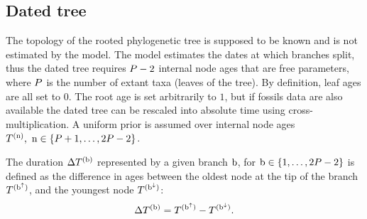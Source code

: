 \documentclass{MBE}
\begin{document}
	\subsection{Dated tree}
	The topology of the rooted phylogenetic tree is supposed to be known and is not estimated by the model.
	The model estimates the dates at which branches split, thus the dated tree requires $P - 2$ internal node ages that are free parameters, where $P$ is the number of extant taxa (leaves of the tree).
	By definition, leaf ages are all set to $0$.
	The root age is set arbitrarily to $1$, but if fossils data are also available the dated tree can be rescaled into absolute time using cross-multiplication.
	A uniform prior is assumed over internal node ages $T^{(\text{n})},\ \text{n} \in \{P + 1, \hdots, 2 P - 2\}$.

	The duration $\Delta T^{(\text{b})}$ represented by a given branch $\text{b}$, for $\text{b} \in \{1, \hdots, 2 P - 2\}$ is defined as the difference in ages between the oldest node at the tip of the branch $T^{(\text{b}^{\uparrow})}$, and the youngest node $T^{(\text{b}^{\downarrow})}$:
	\begin{equation}
		\label{eq:ageTobranchtime}
		\branchtime\branchexp = \age^{(\nodeUp)} - \age^{(\nodeDown)}.
	\end{equation}
\end{document}
